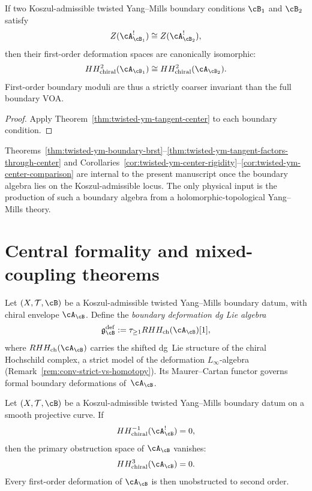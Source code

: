 \begin{corollary}
\label{cor:twisted-ym-center-comparison}
If two Koszul-admissible twisted Yang--Mills boundary conditions $\cB_1$ and $\cB_2$ satisfy
\[
Z(\cA_{\cB_1}^!) \cong Z(\cA_{\cB_2}^!),
\]
then their first-order deformation spaces are canonically isomorphic:
\[
HH^2_{\mathrm{chiral}}(\cA_{\cB_1}) \cong HH^2_{\mathrm{chiral}}(\cA_{\cB_2}).
\]
First-order boundary moduli are thus a strictly coarser invariant than the full
boundary VOA.
\end{corollary}

\begin{proof}
Apply Theorem~\ref{thm:twisted-ym-tangent-center} to each boundary condition.
\end{proof}

\begin{remark}
\label{rem:twisted-ym-math-vs-physics}
Theorems~\ref{thm:twisted-ym-boundary-brst}--\ref{thm:twisted-ym-tangent-factors-through-center}
and Corollaries~\ref{cor:twisted-ym-center-rigidity}--\ref{cor:twisted-ym-center-comparison}
are internal to the present manuscript once the boundary algebra lies on
the Koszul-admissible locus. The only physical input is the production of such a
boundary algebra from a holomorphic-topological Yang--Mills theory.
\end{remark}


\section{Central formality and mixed-coupling theorems}
\label{sec:twisted-ym-central-formality}

\begin{definition}
\label{def:twisted-ym-def-dglie}
Let $(X,\mathcal{T},\cB)$ be a Koszul-admissible twisted Yang--Mills boundary datum, with chiral envelope $\cA_{\cB}$. Define the \emph{boundary deformation dg Lie algebra}
\[
\mathfrak{g}^{\mathrm{def}}_{\cB}
:=
\tau_{\ge 1} RHH_{\mathrm{ch}}(\cA_{\cB})[1],
\]
where $RHH_{\mathrm{ch}}(\cA_{\cB})$ carries the shifted dg~Lie structure of the chiral Hochschild complex, a strict model of the deformation $L_\infty$-algebra (Remark~\ref{rem:conv-strict-vs-homotopy}). Its Maurer--Cartan functor governs formal boundary deformations of~$\cA_{\cB}$.
\end{definition}

\begin{theorem}
\label{thm:twisted-ym-dual-unobstructedness}
Let $(X,\mathcal{T},\cB)$ be a Koszul-admissible twisted Yang--Mills boundary datum on a smooth projective curve. If
\[
HH^{-1}_{\mathrm{chiral}}(\cA_{\cB}^{!}) = 0,
\]
then the primary obstruction space of $\cA_{\cB}$ vanishes:
\[
HH^{3}_{\mathrm{chiral}}(\cA_{\cB}) = 0.
\]
Every first-order deformation of $\cA_{\cB}$ is then unobstructed to second order.
\end{theorem}

